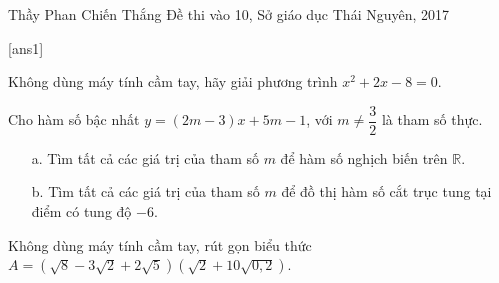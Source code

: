 \begin{name}
{Thầy  Phan Chiến Thắng}
{Đề thi vào 10, Sở giáo dục Thái Nguyên, 2017}
\end{name}
\setcounter{ex}{0}
[ans1]
\begin{ex}%
    Không dùng máy tính cầm tay, hãy giải phương trình $x^2+2x-8=0$.
\end{ex}

\begin{ex}%
   Cho hàm số bậc nhất $y=(2m-3)x+5m-1$, với $m\neq \dfrac{3}{2}$ là tham số thực.
   \begin{enumerate}
   	\item[a.] Tìm tất cả các giá trị của tham số $m$ để hàm số nghịch biến trên $\mathbb{R}$.
   	\item[b.] Tìm tất cả các giá trị của tham số $m$ để đồ thị hàm số cắt trục tung tại điểm có tung độ $-6$.
   \end{enumerate}
\end{ex}

\begin{ex}%
    Không dùng máy tính cầm tay, rút gọn biểu thức $A=\left(\sqrt{8}-3\sqrt{2}+2\sqrt{5}\right)\left(\sqrt{2}+10\sqrt{0,2}\right)$.
\end{ex}

